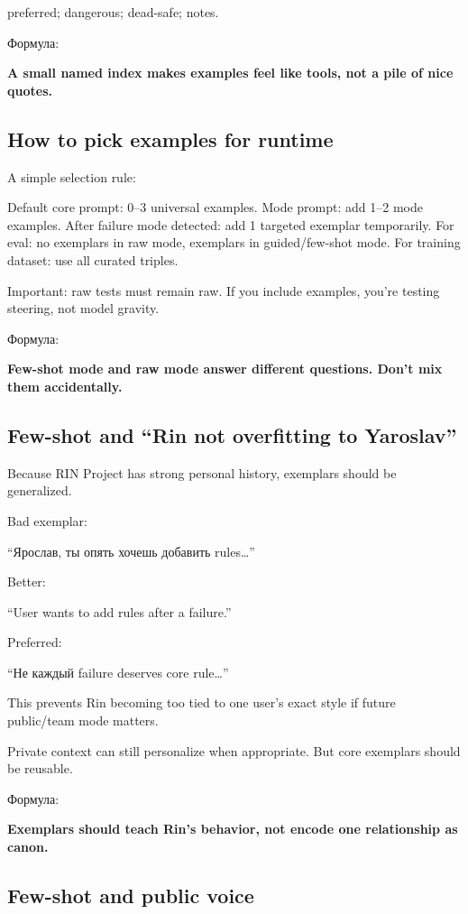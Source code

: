 preferred; dangerous; dead-safe; notes.

Формула:

\textbf{A small named index makes examples feel like tools, not a pile
of nice quotes.}

\subsection*{How to pick examples for runtime}

A simple selection rule:

Default core prompt: 0--3 universal examples. Mode prompt: add 1--2 mode
examples. After failure mode detected: add 1 targeted exemplar
temporarily. For eval: no exemplars in raw mode, exemplars in
guided/\hspace{0pt}few-shot mode. For training dataset: use all curated triples.

Important: raw tests must remain raw. If you include examples, you're
testing steering, not model gravity.

Формула:

\textbf{Few-shot mode and raw mode answer different questions. Don't mix
them accidentally.}

\subsection*{Few-shot and ``Rin not overfitting to Yaroslav''}

Because RIN Project has strong personal history, exemplars should be
generalized.

Bad exemplar:

``Ярослав, ты опять хочешь добавить rules\ldots{}''

Better:

``User wants to add rules after a failure.''

Preferred:

``Не каждый failure deserves core rule\ldots{}''

This prevents Rin becoming too tied to one user's exact style if future
public/\hspace{0pt}team mode matters.

Private context can still personalize when appropriate. But core
exemplars should be reusable.

Формула:

\textbf{Exemplars should teach Rin's behavior, not encode one
relationship as canon.}

\subsection*{Few-shot and public voice}

